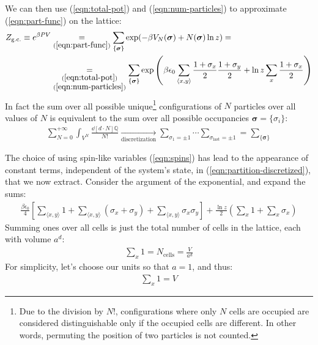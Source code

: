 \documentclass[../../main.tex]{subfiles}
\begin{document}
We can then use (\ref{eqn:total-pot}) and (\ref{eqn:num-particles}) to approximate (\ref{eqn:part-func}) on the lattice:
\begin{align}\nonumber
    Z_{\mathrm{g.c.}} \equiv e^{\beta P V} &\underset{(\ref{eqn:part-func})}{=} \sum_{\{\bm{\sigma}\}} \exp(-\beta V_N(\bm{\sigma}) + N(\bm{\sigma}) \ln z) =\\
    &\underset{\substack{(\ref{eqn:total-pot})\\(\ref{eqn:num-particles})}}{=} \sum_{\{\bm{\sigma}\}} \exp \left(\beta \epsilon_0 \sum_{\langle x,y \rangle} \frac{1+\sigma_x}{2} \frac{1+\sigma_y}{2} + \ln z \sum_x \frac{1+\sigma_x}{2}   \right) \label{eqn:partition-discretized}
\end{align}
In fact the sum over all possible unique\footnote{Due to the division by $N!$, configurations where only $N$ cells are occupied are considered distinguishable only if the occupied cells are different. In other words, permuting the position of two particles is not counted.} configurations of $N$ particles over all values of $N$ is equivalent to the sum over all possible occupancies $\bm{\sigma} = \{\sigma_i\}$:
\begin{align*}
    \sum_{N=0}^{+\infty} \int_{V^N} \frac{\dd[d \cdot N]{\mathbb{Q}}}{N!} \xrightarrow[\text{discretization}]{} \sum_{\sigma_1 = \pm 1} \cdots \sum_{\sigma_\mathrm{last}  = \pm 1} = \sum_{\{\bm{\sigma}\}}
\end{align*}


\medskip

The choice of using spin-like variables (\ref{eqn:spins}) has lead to the appearance of constant terms, independent of the system's state, in (\ref{eqn:partition-discretized}), that we now extract. Consider the argument of the exponential, and expand the sums:
\begin{align}\label{eqn:expon}
    \frac{\beta \epsilon_0}{4} \left[\sum_{\langle x,y \rangle} 1 + \sum_{\langle x,y \rangle} (\sigma_x + \sigma_y) + \sum_{\langle x,y \rangle}\sigma_x \sigma_y\right] + \frac{\ln z}{2} \left(\sum_x 1 + \sum_x \sigma_x\right)
\end{align}
Summing ones over all cells is just the total number of cells in the lattice, each with volume $a^d$:
\begin{align*}
    \sum_x 1 = N_{\mathrm{cells}} = \frac{V}{a^d} 
\end{align*}
For simplicity, let's choose our units so that $a=1$, and thus:
\begin{align}\label{eqn:sum1}
    \sum_x 1 = V
\end{align}
\end{document}
